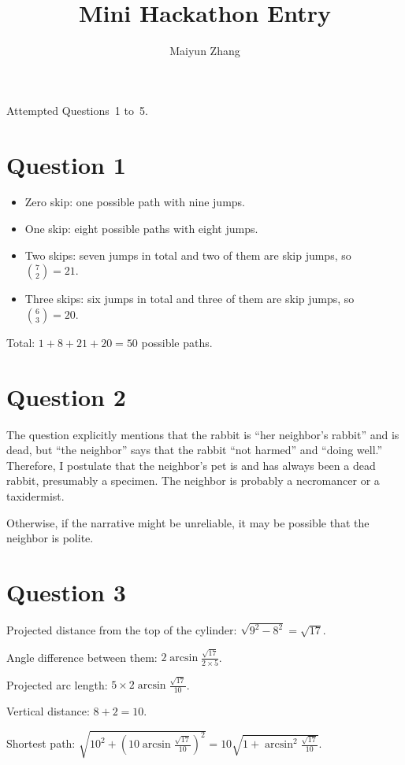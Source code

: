 \documentclass[12pt]{article}
\title{Mini Hackathon Entry}
\author{Maiyun Zhang}
\begin{document}
\maketitle

Attempted Questions~1 to~5.

\section*{Question 1}

\begin{itemize}
    \item Zero skip: one possible path with nine jumps.
    \item One skip: eight possible paths with eight jumps.
    \item Two skips: seven jumps in total and two of them are skip jumps, so \(\binom{7}{2} = 21\).
    \item Three skips: six jumps in total and three of them are skip jumps, so \(\binom{6}{3} = 20\).
\end{itemize}

Total: \(1 + 8 + 21 + 20 = 50\) possible paths.

\section*{Question 2}
The question explicitly mentions that the rabbit is ``her neighbor's rabbit'' and is dead, but ``the neighbor'' says that the rabbit ``not harmed'' and ``doing well.'' Therefore, I postulate that the neighbor's pet is and has always been a dead rabbit, presumably a specimen. The neighbor is probably a necromancer or a taxidermist.

Otherwise, if the narrative might be unreliable, it may be possible that the neighbor is polite.

\section*{Question 3}
Projected distance from the top of the cylinder: \(\sqrt{9^2 - 8^2} = \sqrt{17}\).

Angle difference between them: \(2\arcsin \frac{\sqrt{17}}{2 \times 5}\).

Projected arc length: \(5 \times 2\arcsin \frac{\sqrt{17}}{10}\).

Vertical distance: \(8 + 2 = 10\).

Shortest path: \(\sqrt{10^2 + (10\arcsin \frac{\sqrt{17}}{10})^2} = 10 \sqrt{1 + \arcsin^2 \frac{\sqrt{17}}{10}}\).
\end{document}
